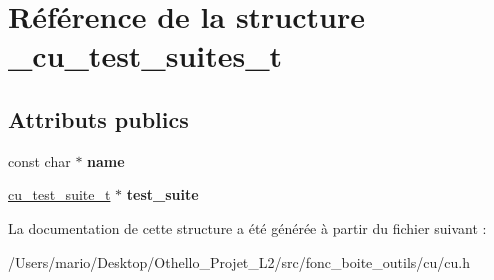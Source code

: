 \hypertarget{struct__cu__test__suites__t}{}\section{Référence de la structure \+\_\+cu\+\_\+test\+\_\+suites\+\_\+t}
\label{struct__cu__test__suites__t}
\subsection*{Attributs publics}
\begin{DoxyCompactItemize}
\item 
\mbox{\label{struct__cu__test__suites__t_aaf735064c78464955838f947f3ff45af}} 
const char $\ast$ {\bfseries name}
\item 
\mbox{\label{struct__cu__test__suites__t_a1308e81581aa7912577b45ae350b69eb}} 
\mbox{\hyperlink{struct__cu__test__suite__t}{cu\+\_\+test\+\_\+suite\+\_\+t}} $\ast$ {\bfseries test\+\_\+suite}
\end{DoxyCompactItemize}


La documentation de cette structure a été générée à partir du fichier suivant \+:\begin{DoxyCompactItemize}
\item 
/\+Users/mario/\+Desktop/\+Othello\+\_\+\+Projet\+\_\+\+L2/src/fonc\+\_\+boite\+\_\+outils/cu/cu.\+h\end{DoxyCompactItemize}
